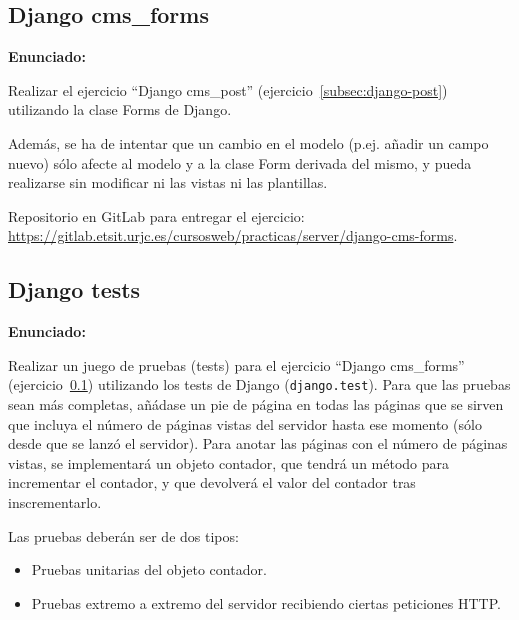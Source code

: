 \subsection{Django cms\_forms}
\label{subsec:django-forms}

\textbf{Enunciado:}

Realizar el ejercicio ``Django cms\_post'' (ejercicio~\ref{subsec:django-post}) utilizando la clase Forms de Django. 

Además, se ha de intentar que un cambio en el modelo (p.ej. añadir un campo nuevo) sólo afecte al modelo y a la clase Form derivada del mismo, y pueda realizarse sin modificar ni las vistas ni las plantillas.

Repositorio en GitLab para entregar el ejercicio: \\ 
\url{https://gitlab.etsit.urjc.es/cursosweb/practicas/server/django-cms-forms}.


\subsection{Django tests}
\label{subsec:django-tests}

\textbf{Enunciado:}

Realizar un juego de pruebas (tests) para el ejercicio ``Django cms\_forms'' (ejercicio~\ref{subsec:django-forms}) utilizando los tests de Django (\texttt{django.test}). Para que las pruebas sean más completas, añádase un pie de página en todas las páginas que se sirven que incluya el número de páginas vistas del servidor hasta ese momento (sólo desde que se lanzó el servidor). Para anotar las páginas con el número de páginas vistas, se implementará un objeto contador, que tendrá un método para incrementar el contador, y que devolverá el valor del contador tras inscrementarlo.

Las pruebas deberán ser de dos tipos:

\begin{itemize}
\item Pruebas unitarias del objeto contador.
\item Pruebas extremo a extremo del servidor recibiendo ciertas peticiones HTTP.
\end{itemize}

